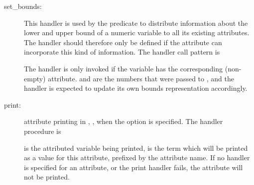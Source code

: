 \begin{description}
\item [set_bounds:]
    This handler is used by the predicate
    to distribute information about the lower and upper bound of a numeric
    variable to all its existing attributes.
    The handler should therefore only be defined if the attribute can
    incorporate this kind of information. The handler call pattern is
    \begin{quote}
    \end{quote}
    The handler is only invoked if the variable has the corresponding
    (non-empty) attribute.
     and  are the numbers that were passed to
    ,
    and the handler is expected to update its
    own bounds representation accordingly.



\item [print:]
  attribute printing in
,%
,%
%
when the  option is specified.
The handler procedure is
\begin{quote}
\end{quote}
 is the attributed variable being printed, 
is the term which will be printed as a value for this attribute,
prefixed by the attribute name.
If no handler is specified for an attribute, or the print handler fails,
the attribute will not be printed.

\end{description}


